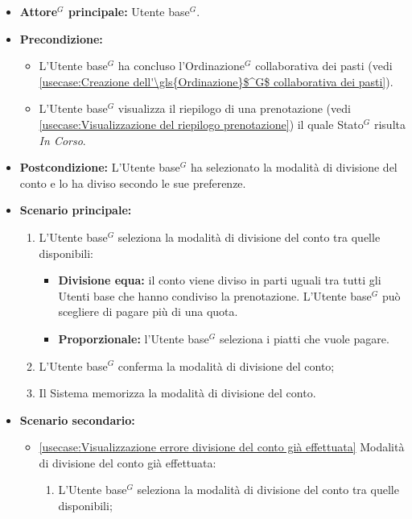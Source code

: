 \label{usecase:Selezione della modalità di divisione del conto}
\begin{itemize}
	\item \textbf{\gls{Attore}$^G$ principale:} \gls{Utente base}$^G$.
	
	\item \textbf{Precondizione:}
	\begin{itemize}
		\item L'\gls{Utente base}$^G$ ha concluso l'\gls{Ordinazione}$^G$ collaborativa dei pasti (vedi \autoref{usecase:Creazione dell'\gls{Ordinazione}$^G$ collaborativa dei pasti}).
		\item L'\gls{Utente base}$^G$ visualizza il riepilogo di una prenotazione (vedi \autoref{usecase:Visualizzazione del riepilogo prenotazione}) il quale \gls{Stato}$^G$ risulta \textit{In Corso}. 
	\end{itemize}

	\item \textbf{Postcondizione:}
	      L'\gls{Utente base}$^G$ ha selezionato la modalità di divisione del conto e lo ha diviso secondo le sue preferenze.
	\item \textbf{Scenario principale:}
	      \begin{enumerate}
		      \item L'\gls{Utente base}$^G$ seleziona la modalità di divisione del conto
		            tra quelle disponibili:
					\begin{itemize}
						\item \textbf{Divisione equa:} il conto viene diviso in parti
							  uguali tra tutti gli Utenti base che hanno condiviso la
							  prenotazione. L'\gls{Utente base}$^G$ può scegliere di pagare più di
							  una quota.
		  
						\item \textbf{Proporzionale:} l'\gls{Utente base}$^G$ seleziona i piatti che vuole
							  pagare.
					\end{itemize}

		      \item L'\gls{Utente base}$^G$ conferma la modalità di divisione del conto;

		      \item Il Sistema memorizza la modalità di divisione del conto.
	      \end{enumerate}

	\item \textbf{Scenario secondario:}
		  \begin{itemize}
			  \item \autoref{usecase:Visualizzazione errore divisione del conto già effettuata} Modalità di divisione del conto già effettuata:
				\begin{enumerate}
					\item L'\gls{Utente base}$^G$ seleziona la modalità di divisione del conto
						tra quelle disponibili;
	

\end{enumerate}
\end{itemize}
\end{itemize}
